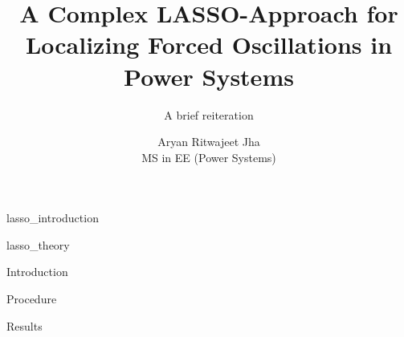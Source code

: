 \documentclass[10pt]{beamer}
\title{A Complex LASSO-Approach for Localizing Forced Oscillations in Power Systems}
\subtitle{A brief reiteration}
\date{}
\author{Aryan Ritwajeet Jha \\MS in EE (Power Systems)}
\institute{Department of Electrical Engineering\\ IIT Delhi}
\begin{document}
\maketitle

{lasso_introduction}

{lasso_theory}

{Introduction}


{Procedure}

{Results}


\end{document}

